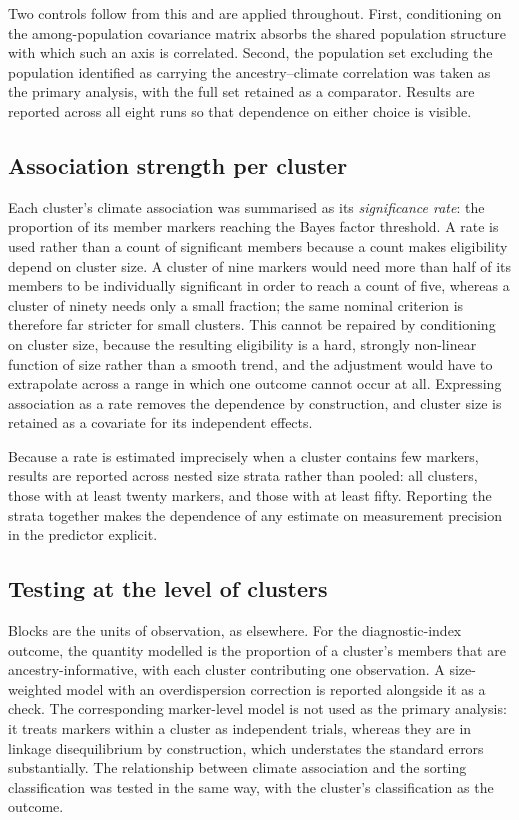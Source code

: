 \documentclass[11pt]{article}
\begin{document}
Two controls follow from this and are applied throughout. First, conditioning on
the among-population covariance matrix absorbs the shared population structure
with which such an axis is correlated. Second, the population set excluding the
population identified as carrying the ancestry--climate correlation was taken as
the primary analysis, with the full set retained as a comparator. Results are
reported across all eight runs so that dependence on either choice is visible.

\subsection{Association strength per cluster}
Each cluster's climate association was summarised as its \emph{significance
rate}: the proportion of its member markers reaching the Bayes factor threshold.
A rate is used rather than a count of significant members because a count makes
eligibility depend on cluster size. A cluster of nine markers would need more than
half of its members to be individually significant in order to reach a count of
five, whereas a cluster of ninety needs only a small fraction; the same nominal
criterion is therefore far stricter for small clusters. This cannot be repaired by
conditioning on cluster size, because the resulting eligibility is a hard,
strongly non-linear function of size rather than a smooth trend, and the
adjustment would have to extrapolate across a range in which one outcome cannot
occur at all. Expressing association as a rate removes the dependence by
construction, and cluster size is retained as a covariate for its independent
effects.

Because a rate is estimated imprecisely when a cluster contains few markers,
results are reported across nested size strata rather than pooled: all clusters,
those with at least twenty markers, and those with at least fifty. Reporting the
strata together makes the dependence of any estimate on measurement precision in
the predictor explicit.

\subsection{Testing at the level of clusters}
Blocks are the units of observation, as elsewhere. For the diagnostic-index
outcome, the quantity modelled is the proportion of a cluster's members that are
ancestry-informative, with each cluster contributing one observation. A
size-weighted model with an overdispersion correction is reported alongside it as
a check. The corresponding marker-level model is not used as the primary
analysis: it treats markers within a cluster as independent trials, whereas they
are in linkage disequilibrium by construction, which understates the standard
errors substantially. The relationship between climate association and the
sorting classification was tested in the same way, with the cluster's
classification as the outcome.
\end{document}
